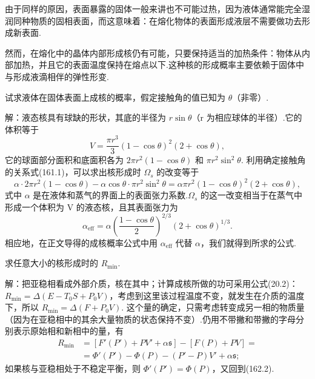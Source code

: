 由于同样的原因，表面暴露的固体一般来讲也不可能过热，因为液体通常能完全湿润同种物质的固相表面，而这意味着：在熔化物体的表面形成液层不需要做功去形成新表面.

然而，在熔化中的晶体内部形成核仍有可能，只要保持适当的加热条件：物体从内部加热，并且它的表面温度保持在熔点以下.这种核的形成概率主要依赖于固体中与形成液滴相伴的弹性形变.

\begin{xiti}

\quad 试求液体在固体表面上成核的概率，假定接触角的值已知为 $\theta$（非零）.

解：液态核具有球缺的形状，其底的半径为 $r\sin\theta$（r 为相应球体的半径）.它的体积等于
\begin{equation*}
  V=\frac{\pi r^3}{3}(1-\cos\theta)^2(2+\cos\theta),
\end{equation*}
它的球面部分面积和底面积各为 $2\pi r^2(1-\cos\theta)$ 和 $\pi r^2\sin^2\theta$. 利用确定接触角的关系式(161.1)，可以求出核形成时 $\Omega_s$ 的改变等于
\begin{equation*}
  \alpha\cdot2\pi r^2(1-\cos\theta)-\alpha\cos\theta\cdot\pi r^2\sin^2\theta
  =\alpha\pi r^2(1-\cos\theta)^2(2+\cos\theta),
\end{equation*}
式中 $\alpha$ 是在液体和蒸气的界面上的表面张力系数.$\Omega_s$ 的这一改变相当于在蒸气中形成一个体积为 V 的液态核，且其表面张力为
\begin{equation*}
  \alpha_{\mathrm{eff}}=\alpha\left(\frac{1-\cos\theta}{2}\right)^{2/3}
  (2+\cos\theta)^{1/3}.
\end{equation*}
相应地，在正文导得的成核概率公式中用 $\alpha_{\mathrm{eff}}$ 代替 $\alpha$，我们就得到所求的公式.

\quad 求任意大小的核形成时的 $R_{\mathrm{min}}$.

解：把亚稳相看成外部介质，核在其中；计算成核所做的功可采用公式(20.2)：$R_{\mathrm{min}}=\Delta(E-T_0S+P_0V)$，考虑到这里该过程温度不变，就发生在介质的温度下，所以 $R_{\mathrm{min}}=\Delta(F+P_0V)$. 这个量的确定，只需考虑转变成另一相的物质量（因为在亚稳相中的其余大量物质的状态保持不变）.仍用不带撇和带撇的字母分别表示原始相和新相中的量，有
\begin{equation*}
\begin{aligned}
  R_{\mathrm{min}}&=\left[F'(P')+PV'+\alpha\mathfrak{s}\right]
  -\left[F(P)+PV\right]=\\
  &=\Phi'(P')-\Phi(P)-(P'-P)V'+\alpha\mathfrak{s};
\end{aligned}
\tag{1}
\end{equation*}
如果核与亚稳相处于不稳定平衡，则 $\Phi'(P')=\Phi(P)$，又回到(162.2).


\end{xiti}
